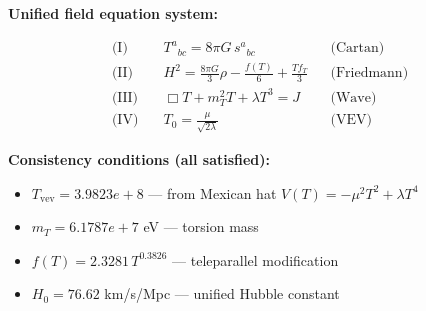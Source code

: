 
\textbf{Unified field equation system:}

\begin{align}
  \text{(I)} \quad & T^a{}_{bc} = 8\pi G \, s^a{}_{bc} && \text{(Cartan)} \\
  \text{(II)} \quad & H^2 = \frac{8\pi G}{3}\rho - \frac{f(T)}{6} + \frac{Tf_T}{3} && \text{(Friedmann)} \\
  \text{(III)} \quad & \Box T + m_T^2 T + \lambda T^3 = J && \text{(Wave)} \\
  \text{(IV)} \quad & T_0 = \frac{\mu}{\sqrt{2\lambda}} && \text{(VEV)}
\end{align}

\textbf{Consistency conditions (all satisfied):}
\begin{itemize}
  \item $T_{\text{vev}} = 3.9823e+8$ — from Mexican hat $V(T) = -\mu^2 T^2 + \lambda T^4$
  \item $m_T = 6.1787e+7$ eV — torsion mass
  \item $f(T) = 2.3281 \, T^{0.3826}$ — teleparallel modification
  \item $H_0 = 76.62$ km/s/Mpc — unified Hubble constant
\end{itemize}